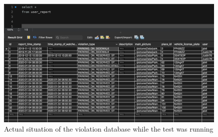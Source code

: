 \documentclass[../ATD.tex]{subfiles}
\begin{document}
    \begin{figure}[H]
        \centering
        \includegraphics{../assets/database_user_report.png}
        \caption{Actual situation of the violation database while the test was running}
    \end{figure}
\end{document}
